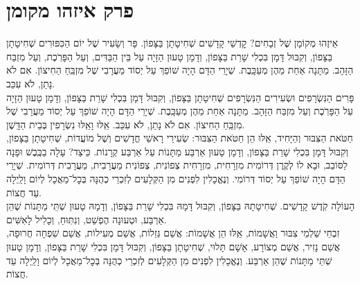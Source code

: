 \documentclass[12pt,letterpaper]{siddur}
\begin{document}
\section{פרק איזהו מקומן}
\mishnah
אֵיזֶהוּ מְקוֹמָן שֶׁל זְבָחִים? קׇדְשֵׁי קָדָשִׁים שְׁחִיטָתָן בַּצָּפוֹן. פָּר וְשָׂעִיר שֶׁל יוֹם הַכִּפּוּרִים שְׁחִיטָתָן בַּצָּפוֹן, וְקִבּוּל דָּמָן בִּכְלִי שָׁרֵת בַּצָּפוֹן, וְדָמָן טָעוּן הַזָּיָה עַל בֵּין הַבַּדִּים, וְעַל הַפָּרֹֽכֶת, וְעַל מִזְבַּח הַזָּהָב. מַתָּנָה אַחַת מֵהֶן מְעַכָּֽבֶת. שְׁיָרֵי הַדָּם הָיָה שׁוֹפֵךְ עַל יְסוֹד מַעֲרָבִי שֶׁל מִזְבֵּֽחַ הַחִיצוֹן. אִם לֹא נָתַן, לֹא עִכֵּב.\\
\mishnah
פָּרִים הַנִּשְׂרָפִים וּשְׂעִירִים הַנִּשְׂרָפִים שְׁחִיטָתָן בַּצָּפוֹן, וְקִבּוּל דָּמָן בִּכְלִי שָׁרֵת בַּצָּפוֹן, וְדָמָן טָעוּן הַזָּיָה עַל הַפָּרֹֽכֶת וְעַל מִזְבַּח הַזָּהָב. מַתָּנָה אַחַת מֵהֶן מְעַכָּֽבֶת. שְׁיָרֵי הַדָּם הָיָה שׁוֹפֵךְ עַל יְסוֹד מַעֲרָבִי שֶׁל מִזְבֵּֽחַ הַחִיצוֹן. אִם לֹא נָתַן, לֹא עִכֵּב. אֵֽלּוּ וָאֵֽלּוּ נִשְׂרָפִין בְּבֵית הַדָּֽשֶׁן.\\
\mishnah
חַטֹּאת הַצִּבּוּר וְהַיָּחִיד, אֵֽלּוּ הֵן חַטֹּאת הַצִּבּוּר: שְׂעִירֵי רָאשֵׁי חֳדָשִׁים וְשֶׁל מוֹעֲדוֹת, שְׁחִיטָתָן בַּצָּפוֹן, וְקִבּוּל דָּמָן בִּכְלִי שָׁרֵת בַּצָּפוֹן, וְדָמָן טָעוּן אַרְבַּע מַתָּנוֹת עַל אַרְבַּע קְרָנוֹת. כֵּיצַד? עָלָה בַכֶּֽבֶשׁ וּפָנָה לַסּוֹבֵב, וּבָא לוֹ לְקֶֽרֶן דְּרוֹמִית מִזְרָחִית, מִזְרָחִית צְפוֹנִית, צְפוֹנִית מַעֲרָבִית, מַעֲרָבִית דְּרוֹמִית. שְׁיָרֵי הַדָּם הָיָה שׁוֹפֵךְ עַל יְסוֹד דְּרוֹמִי. וְנֶאֱכָלִין לִפְנִים מִן הַקְּלָעִים לְזִכְרֵי כְהֻנָּה בְּכׇל־מַאֲכָל לְיוֹם וָלַֽיְלָה עַד חֲצוֹת.\\
\mishnah
הָעוֹלָה קֹֽדֶשׁ קָדָשִׁים. שְׁחִיטָתָהּ בַּצָּפוֹן, וְקִבּוּל דָּמָהּ בִּכְלִי שָׁרֵת בַּצָּפוֹן, וְדָמָהּ טָעוּן שְׁתֵּי מַתָּנוֹת שֶׁהֵן אַרְבַּע, וּטְעוּנָה הֶפְשֵׁט, וְנִתּֽוּחַ, וְכָלִיל לָאִשִּׁים.\\
\mishnah
זִבְחֵי שַׁלְמֵי צִבּוּר וַאֲשָׁמוֹת, אֵֽלּוּ הֵן אֲשָׁמוֹת: אֲשַׁם גְּזֵלוֹת, אֲשַׁם מְעִילוֹת, אֲשַׁם שִׁפְחָה חֲרוּפָה, אֲשַׁם נָזִיר, אֲשַׁם מְצוֹרָע, אָשָׁם תָּלוּי, שְׁחִיטָתָן בַּצָּפוֹן, וְקִבּוּל דָּמָן בִּכְלִי שָׁרֵת בַּצָּפוֹן, וְדָמָן טָעוּן שְׁתֵּי מַתָּנוֹת שֶׁהֵן אַרְבַּע. וְנֶאֱכָלִין לִפְנִים מִן הַקְּלָעִים לְזִכְרֵי כְהֻנָּה בְּכׇל־מַאֲכָל לְיוֹם וָלַֽיְלָה עַד חֲצוֹת.
\end{document}
